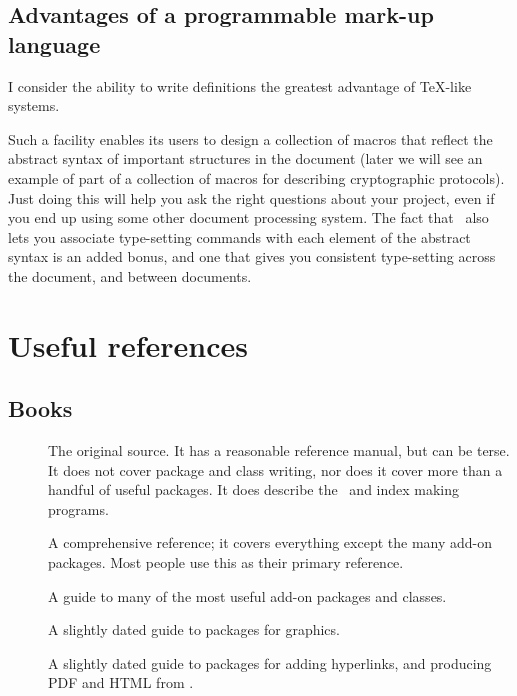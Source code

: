 \documentclass[authoryearcitations]{UoYCSproject}
\begin{document}
\section{Advantages of a programmable mark-up language}
\label{sec:advantagesofprogrammable}

I consider the ability to write definitions the greatest advantage of
\TeX-like systems.

Such a facility enables its users to design a collection of macros
that reflect the abstract syntax of important structures in the
document (later we will see an example of part of a collection of
macros for describing cryptographic protocols).  Just doing this will
help you ask the right questions about your project, even if you end
up using some other document processing system.  The fact that
\LaTeXe\ also lets you associate type-setting commands with each
element of the abstract syntax is an added bonus, and one that gives
you consistent type-setting across the document, and between
documents.

\cleardoublepage
\chapter{Useful references}
\label{cha:usefulrefs}


\section{Books}
\label{sec:books}

\begin{description}
\item[\citet{Lamport1994}] The original source.  It has a reasonable
  reference manual, but can be terse.  It does not cover package and
  class writing, nor does it cover more than a handful of useful
  packages.  It does describe the \BibTeX\ and index making programs.
\item[\citet{KopkaDaly1999}] A comprehensive reference; it covers
  everything except the many add-on packages.  Most people use this as
  their primary reference.
\item[\citet{MittelbachGoossensBraamsCarlisleRowley2004}] A guide to
  many of the most useful add-on packages and classes.
\item[\citet{GoosensRahtzMittelbach1997}] A slightly dated guide to
  packages for graphics.
\item[\citet{GoosensRahtzGurariMooreSutor1999}] A slightly dated guide
  to packages for adding hyperlinks, and producing PDF and HTML from
  \LaTeXe.
\end{description}
\end{document}
